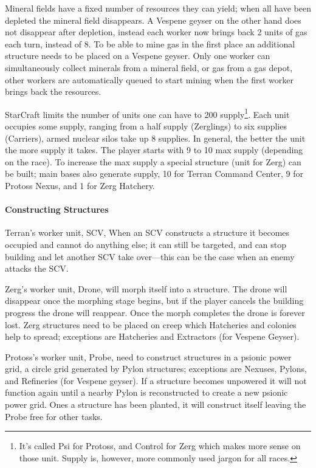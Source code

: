 Mineral fields have a fixed number of resources they can yield; when all have been depleted the mineral field disappears. A Vespene geyser on the other hand does not disappear after depletion, instead each worker now brings back 2 units of gas each turn, instead of 8. To be able to mine gas in the first place an additional structure needs to be placed on a Vespene geyser. Only one worker can simultaneously collect minerals from a mineral field, or gas from a gas depot, other workers are automatically queued to start mining when the first worker brings back the resources.

StarCraft limits the number of units one can have to 200 supply\footnote{It’s called Psi for Protoss, and Control for Zerg which makes more sense on those unit. Supply is, however, more commonly used jargon for all races.}. Each unit occupies some supply, ranging from a half supply (Zerglings) to six supplies (Carriers), armed nuclear silos take up 8 supplies. In general, the better the unit the more supply it takes. The player starts with 9 to 10 max supply (depending on the race). To increase the max supply a special structure (unit for Zerg) can be built; main bases also generate supply, 10 for Terran Command Center, 9 for Protoss Nexus, and 1 for Zerg Hatchery.

\paragraph{Constructing Structures}
Terran's worker unit, SCV,  When an SCV constructs a structure it becomes occupied and cannot do anything else; it can still be targeted, and can stop building and let another SCV take over—this can be the case when an enemy attacks the SCV.

Zerg’s worker unit, Drone, will morph itself into a structure. The drone will disappear once the morphing stage begins, but if the player cancels the building progress the drone will reappear. Once the morph completes the drone is forever lost. Zerg structures need to be placed on creep which Hatcheries and colonies help to spread; exceptions are Hatcheries and Extractors (for Vespene Geyser).

Protoss’s worker unit, Probe, need to construct structures in a psionic power grid, a circle grid generated by Pylon structures; exceptions are Nexuses, Pylons, and Refineries (for Vespene geyser). If a structure becomes unpowered it will not function again until a nearby Pylon is reconstructed to create a new psionic power grid. Ones a structure has been planted, it will construct itself leaving the Probe free for other tasks.

